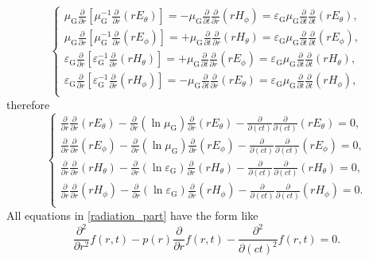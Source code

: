 \documentclass{article}
\def\p{\partial}
\begin{document}
\begin{equation}
    \begin{cases}
        \mu_{\text{G}}\frac{\p}{\p r}[\mu_{\text{G}}^{-1}\frac{\p}{\p r}(r{E}_\theta)]
        =-\mu_{\text{G}}\frac{\p}{\p t}\frac{\p}{\p r}(r{H}_\phi)
        =\varepsilon_{\text{G}}\mu_{\text{G}}\frac{\p}{\p t}\frac{\p}{\p t}(r{E}_\theta),\\
        \mu_{\text{G}}\frac{\p}{\p r}[\mu_{\text{G}}^{-1}\frac{\p}{\p r}(r{E}_\phi)]
        =+\mu_{\text{G}}\frac{\p}{\p t}\frac{\p}{\p r}(r{H}_\theta)
        =\varepsilon_{\text{G}}\mu_{\text{G}}\frac{\p}{\p t}\frac{\p}{\p t}(r{E}_\phi),\\
        \varepsilon_{\text{G}}\frac{\p}{\p r}[\varepsilon_{\text{G}}^{-1}\frac{\p}{\p r}(r{H}_\theta)]
        =+\mu_{\text{G}}\frac{\p}{\p t}\frac{\p}{\p r}(r{E}_\phi)
        =\varepsilon_{\text{G}}\mu_{\text{G}}\frac{\p}{\p t}\frac{\p}{\p t}(r{H}_\theta),\\
        \varepsilon_{\text{G}}\frac{\p}{\p r}[\varepsilon_{\text{G}}^{-1}\frac{\p}{\p r}(r{H}_\phi)]
        =-\mu_{\text{G}}\frac{\p}{\p t}\frac{\p}{\p r}(r{E}_\theta)
        =\varepsilon_{\text{G}}\mu_{\text{G}}\frac{\p}{\p t}\frac{\p}{\p t}(r{H}_\phi),\\
    \end{cases}
\end{equation}
therefore
\begin{equation}\label{radiation_part}
    \begin{cases}
        \frac{\p}{\p r}\frac{\p}{\p r}(r{E}_\theta)-\frac{\p}{\p r}(\ln\mu_{\text{G}})\frac{\p}{\p r}(r{E}_\theta)-\frac{\p}{\p (ct)}\frac{\p}{\p (ct)}(r{E}_\theta)=0,\\
        \frac{\p}{\p r}\frac{\p}{\p r}(r{E}_\phi)-\frac{\p}{\p r}(\ln\mu_{\text{G}})\frac{\p}{\p r}(r{E}_\phi)-\frac{\p}{\p (ct)}\frac{\p}{\p (ct)}(r{E}_\phi)=0,\\
        \frac{\p}{\p r}\frac{\p}{\p r}(r{H}_\theta)-\frac{\p}{\p r}(\ln\varepsilon_{\text{G}})\frac{\p}{\p r}(r{H}_\theta)-\frac{\p}{\p (ct)}\frac{\p}{\p (ct)}(r{H}_\theta)=0,\\
        \frac{\p}{\p r}\frac{\p}{\p r}(r{H}_\phi)-\frac{\p}{\p r}(\ln\varepsilon_{\text{G}})\frac{\p}{\p r}(r{H}_\phi)-\frac{\p}{\p (ct)}\frac{\p}{\p (ct)}(r{H}_\phi)=0.\\
    \end{cases}
\end{equation}
All equations in \eqref{radiation_part} have the form like
\begin{equation}\label{radiation}
    \frac{\p^2}{\p r^2}f(r,t)-p(r)\frac{\p}{\p r}f(r,t)-\frac{\p^2}{\p (ct)^2}f(r,t)=0.
\end{equation}
\end{document}
